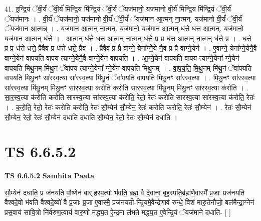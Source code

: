 \documentclass[17pt]{extarticle}
\begin{document}
41. इ॒न्द्रि॒यं ॅवी॒र्यं॑ ॅवी॒र्य॑ मिन्द्रि॒य मि॑न्द्रि॒यं ॅवी॒र्यं॑ ॅयज॑मानो॒ यज॑मानो वी॒र्य॑ मिन्द्रि॒य मि॑न्द्रि॒यं ॅवी॒र्यं॑ ॅयज॑मानः । . वी॒र्यं॑ ॅयज॑मानो॒ यज॑मानो वी॒र्यं॑ ॅवी॒र्यं॑ ॅयज॑मान आ॒त्मन् ना॒त्मन्. यज॑मानो वी॒र्यं॑ ॅवी॒र्यं॑ ॅयज॑मान आ॒त्मन्न् । . यज॑मान आ॒त्मन् ना॒त्मन्. यज॑मानो॒ यज॑मान आ॒त्मन् ध॑त्ते धत्त आ॒त्मन्. यज॑मानो॒ यज॑मान आ॒त्मन् ध॑त्ते । . आ॒त्मन् ध॑त्ते धत्त आ॒त्मन् ना॒त्मन् ध॑त्ते॒ प्र प्र ध॑त्त आ॒त्मन् ना॒त्मन् ध॑त्ते॒ प्र । . ध॒त्ते॒ प्र प्र ध॑त्ते धत्ते॒ प्रैवैव प्र ध॑त्ते धत्ते॒ प्रैव । . प्रैवैव प्र प्रै वाग्ने॒ येना᳚ग्ने॒ये नै॒व प्र प्रै वाग्ने॒येन॑ । . ए॒वाग्ने॒ येना᳚ग्ने॒येनै॒वै वाग्ने॒येन॑ वापयति वापय त्याग्ने॒येनै॒वै वाग्ने॒येन॑ वापयति । . आ॒ग्ने॒येन॑ वापयति वापय त्याग्ने॒येना᳚ ग्ने॒येन॑ वापयति मिथु॒नम् मि॑थु॒नं ॅवा॑पय त्याग्ने॒येना᳚ ग्ने॒येन॑ वापयति मिथु॒नम् । . वा॒प॒य॒ति॒ मि॒थु॒नम् मि॑थु॒नं ॅवा॑पयति वापयति मिथु॒नꣳ सा॑रस्व॒त्या सा॑रस्व॒त्या मि॑थु॒नं ॅवा॑पयति वापयति मिथु॒नꣳ सा॑रस्व॒त्या । . मि॒थु॒नꣳ सा॑रस्व॒त्या सा॑रस्व॒त्या मि॑थु॒नम् मि॑थु॒नꣳ सा॑रस्व॒त्या क॑रोति करोति सारस्व॒त्या मि॑थु॒नम् मि॑थु॒नꣳ सा॑रस्व॒त्या क॑रोति । . सा॒र॒स्व॒त्या क॑रोति करोति सारस्व॒त्या सा॑रस्व॒त्या क॑रोति॒ रेतो॒ रेतः॑ करोति सारस्व॒त्या सा॑रस्व॒त्या क॑रोति॒ रेतः॑ । . क॒रो॒ति॒ रेतो॒ रेतः॑ करोति करोति॒ रेतः॑ सौ॒म्येन॑ सौ॒म्येन॒ रेतः॑ करोति करोति॒ रेतः॑ सौ॒म्येन॑ । . रेतः॑ सौ॒म्येन॑ सौ॒म्येन॒ रेतो॒ रेतः॑ सौ॒म्येन॑ दधाति दधाति सौ॒म्येन॒ रेतो॒ रेतः॑ सौ॒म्येन॑ दधाति । \newline
\pagebreak
{}

\section{ TS 6.6.5.2 }

\textbf{TS 6.6.5.2 } \newline
\textbf{Samhita Paata} \newline

सौ॒म्येन॑ दधाति॒ प्र ज॑नयति पौ॒ष्णेन॑ बार्.हस्प॒त्यो भ॑वति॒ ब्रह्म॒ वै दे॒वानां॒ बृह॒स्पति॒र्ब्रह्म॑णै॒वास्मै᳚ प्र॒जाः प्रज॑नयति वैश्वदे॒वो भ॑वति वैश्वदे॒व्यो॑ वै प्र॒जाः प्र॒जा ए॒वास्मै॒ प्रज॑नयती-न्द्रि॒यमे॒वैन्द्रेणाव॑ रुन्धे॒ विशं॑ मारु॒तेनौजो॒ बल॑मैन्द्रा॒ग्नेन॑ प्रस॒वाय॑ सावि॒त्रो नि॑र्वरुण॒त्वाय॑ वारु॒णो म॑द्ध्य॒त ऐ॒न्द्रमा ल॑भते मद्ध्य॒त ए॒वेन्द्रि॒यं ॅयज॑माने दधाति- [  ] \newline
\end{document}
